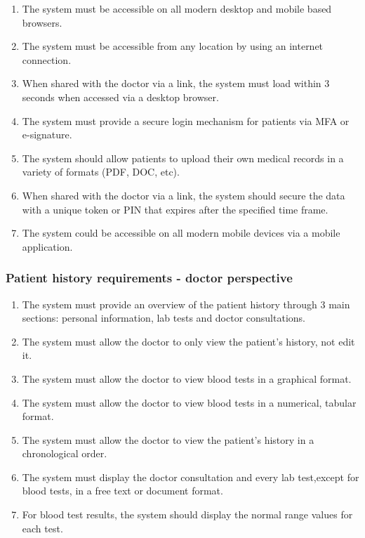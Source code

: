 \begin{enumerate}
    \item The system must be accessible on all modern desktop and mobile based browsers.
    \item The system must be accessible from any location by using an internet connection.
    \item When shared with the doctor via a link, the system must load within 3 seconds when accessed via a desktop browser.
    \item The system must provide a secure login mechanism for patients via MFA or e-signature.
    \item The system should allow patients to upload their own medical records in a variety of formats (PDF, DOC, etc).
    \item When shared with the doctor via a link, the system should secure the data with a unique token or PIN that expires after the specified time frame.
    \item The system could be accessible on all modern mobile devices via a mobile application.
\end{enumerate}

\subsubsection{Patient history requirements - doctor perspective}
\begin{enumerate}
    \item The system must provide an overview of the patient history through 3 main sections: personal information, lab tests and doctor consultations.
    \item The system must allow the doctor to only view the patient's history, not edit it.
    \item The system must allow the doctor to view blood tests in a graphical format.
    \item The system must allow the doctor to view blood tests in a numerical, tabular format.
    \item The system must allow the doctor to view the patient's history in a chronological order.
    \item The system must display the doctor consultation and every lab test,except for blood tests, in a free text or document format.
    \item For blood test results, the system should display the normal range values for each test.
\end{enumerate}

